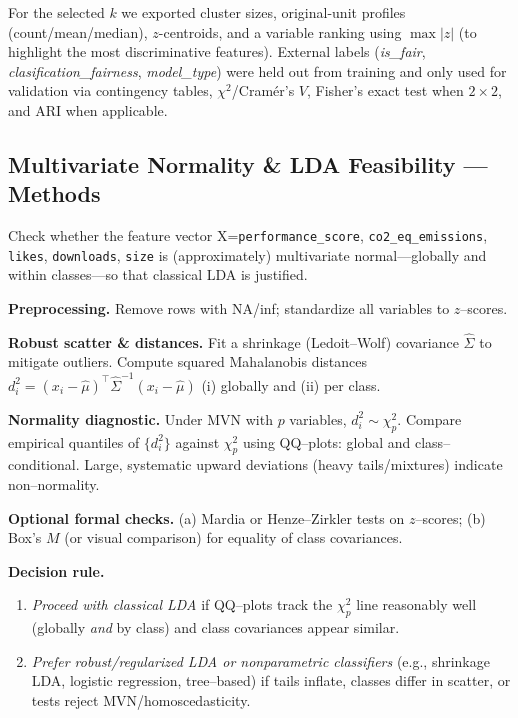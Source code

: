 \documentclass[journal]{IEEEtran}
\begin{document}
For the selected $k$ we exported cluster sizes, original-unit profiles (count/mean/median),
$z$-centroids, and a variable ranking using $\max|z|$ (to highlight the most discriminative features).
External labels (\textit{is\_fair}, \textit{clasification\_fairness}, \textit{model\_type})
were held out from training and only used for validation via contingency tables,
$\chi^2$/Cramér’s $V$, Fisher’s exact test when $2\times 2$, and ARI when applicable.


\subsection{Multivariate Normality \& LDA Feasibility — Methods}
\label{sec:method-lda}

Check whether the feature vector
X=\texttt{performance\_score}, \texttt{co2\_eq\_emissions}, \texttt{likes}, \texttt{downloads}, \texttt{size}
is (approximately) multivariate normal—globally and within classes—so that classical LDA is justified.

\textbf{Preprocessing.} Remove rows with NA/inf; standardize all variables to $z$–scores.

\textbf{Robust scatter \& distances.} Fit a shrinkage (Ledoit–Wolf) covariance
$\widehat{\Sigma}$ to mitigate outliers. Compute squared Mahalanobis distances
$d_i^2=(x_i-\widehat{\mu})^\top\widehat{\Sigma}^{-1}(x_i-\widehat{\mu})$ (i) globally and
(ii) per class.

\textbf{Normality diagnostic.} Under MVN with $p$ variables, $d_i^2\sim\chi^2_p$.
Compare empirical quantiles of $\{d_i^2\}$ against $\chi^2_p$ using QQ–plots:
global and class–conditional. Large, systematic upward deviations (heavy tails/mixtures) indicate
non–normality.

\textbf{Optional formal checks.} (a) Mardia or Henze–Zirkler tests on $z$–scores; (b) Box’s $M$
(or visual comparison) for equality of class covariances.

\textbf{Decision rule.}
\begin{enumerate}[nosep,leftmargin=*]
	\item \emph{Proceed with classical LDA} if QQ–plots track the $\chi^2_p$ line reasonably well
	(globally \emph{and} by class) and class covariances appear similar.
	\item \emph{Prefer robust/regularized LDA or nonparametric classifiers}
	(e.g., shrinkage LDA, logistic regression, tree–based) if tails inflate, classes differ in
	scatter, or tests reject MVN/homoscedasticity.
\end{enumerate}
\end{document}
